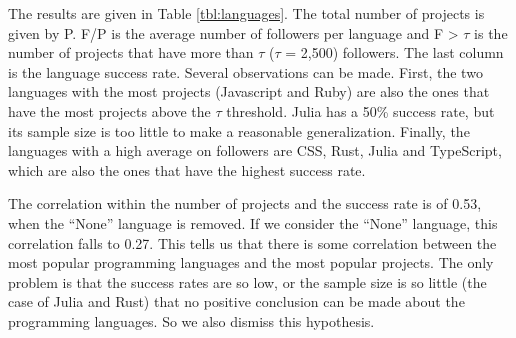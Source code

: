 The results are given in Table \ref{tbl:languages}. The total number of projects is given by P. F/P is the average number of followers per language and F > {$ \tau $} is the number of projects that have more than {$ \tau $} ({$ \tau $} = 2,500) followers. The last column is the language success rate. Several observations can be made. First, the two languages with the most projects (Javascript and Ruby) are also the ones that have the most projects above the {$ \tau $} threshold. Julia has a 50\% success rate, but its sample size is too little to make a reasonable generalization. Finally, the languages with a high average on followers are CSS, Rust, Julia and TypeScript, which are also the ones that have the highest success rate.

The correlation within the number of projects and the success rate is of 0.53, when the ``None'' language is removed. If we consider the ``None'' language, this correlation falls to 0.27. This tells us that there is some correlation between the most popular programming languages and the most popular projects. The only problem is that the success rates are so low, or the sample size is so little (the case of Julia and Rust) that no positive conclusion can be made about the programming languages. So we also dismiss this hypothesis.
